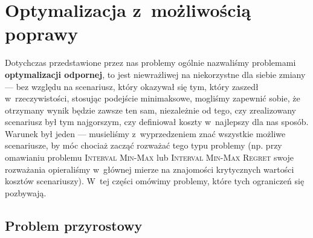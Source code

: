 \section{Optymalizacja z~możliwością poprawy}




Dotychczas przedstawione przez nas problemy ogólnie nazwaliśmy problemami \textbf{optymalizacji odpornej}, to jest niewrażliwej na niekorzystne dla siebie zmiany --- bez względu na scenariusz, który okazywał się tym, który zaszedł w~rzeczywistości, stosując podejście minimaksowe, mogliśmy zapewnić sobie, że otrzymany wynik będzie zawsze ten sam, niezależnie od tego, czy zrealizowany scenariusz był tym najgorszym, czy definiował koszty w~najlepszy dla nas sposób.
Warunek był jeden --- musieliśmy z~wyprzedzeniem znać wszystkie możliwe scenariusze, by móc chociaż zacząć rozważać tego typu problemy (np. przy omawianiu problemu \textsc{Interval Min-Max} lub \textsc{Interval Min-Max Regret} swoje rozważania opieraliśmy w~głównej mierze na znajomości krytycznych wartości kosztów scenariuszy).
W~tej części omówimy problemy, które tych ograniczeń się pozbywają.



\subsection{Problem przyrostowy}



